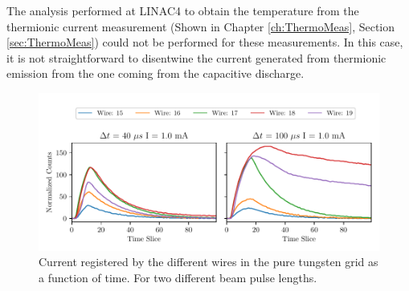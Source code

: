 The analysis performed at LINAC4 to obtain the temperature from the thermionic current measurement (Shown in Chapter \ref{ch:ThermoMeas}, Section \ref{sec:ThermoMeas}) could not be performed for these measurements. In this case, it is not straightforward to disentwine the current generated from thermionic emission from the one coming from the capacitive discharge.  

\begin{figure}[htb]
    \centering
    \includegraphics[width=1.0\columnwidth]{TimeEvolutionProjStudy2/TimeEvolutionStudy2.pdf}
    \caption{Current registered by the different wires in the pure tungsten grid as a function of time. For two different beam pulse lengths. }
    \label{fig:ProjectionOfStudy2}
\end{figure}
